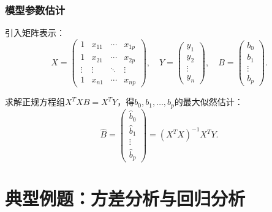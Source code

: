 \documentclass[11pt,a4paper]{report}
\theoremstyle{definition}
\theoremstyle{plain}
\begin{document}
\subsubsection{模型参数估计}

引入矩阵表示：
\[
X=\begin{pmatrix}
1 & x_{11} & \cdots & x_{1p}\\
1 & x_{21} & \cdots & x_{2p}\\
\vdots & \vdots & \ddots & \vdots\\
1 & x_{n1} & \cdots & x_{np}
\end{pmatrix},\quad
Y=\begin{pmatrix}y_1\\y_2\\\vdots\\y_n\end{pmatrix},\quad
B=\begin{pmatrix}b_0\\b_1\\\vdots\\b_p\end{pmatrix}.
\]

求解正规方程组$X^TXB=X^TY$，得$b_0,b_1,\ldots,b_p$的最大似然估计：
\[
\hat{B}=\begin{pmatrix}\hat{b}_0\\\hat{b}_1\\\vdots\\\hat{b}_p\end{pmatrix}=(X^TX)^{-1}X^TY.
\]

\section{典型例题：方差分析与回归分析}
\end{document}

